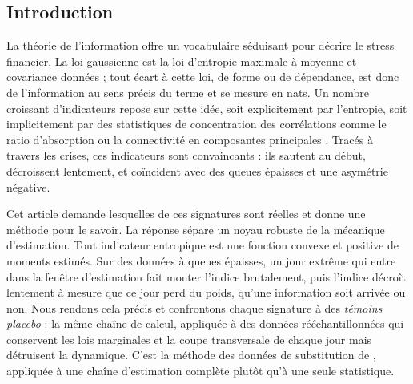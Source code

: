 \documentclass[12pt]{article}
\theoremstyle{definition}
\begin{document}
\begin{doublespace}

\section{Introduction}
\label{sec:intro}

La théorie de l'information offre un vocabulaire séduisant pour décrire le
stress financier. La loi gaussienne est la loi d'entropie maximale à moyenne
et covariance données ; tout écart à cette loi, de forme ou de dépendance, est
donc de l'information au sens précis du terme et se mesure en nats. Un nombre
croissant d'indicateurs repose sur cette idée, soit explicitement par
l'entropie, soit implicitement par des statistiques de concentration des
corrélations comme le ratio d'absorption \citep{kritzman2011} ou la
connectivité en composantes principales \citep{billio2012}. Tracés à travers
les crises, ces indicateurs sont convaincants : ils sautent au début, décroissent
lentement, et coïncident avec des queues épaisses et une asymétrie négative.

Cet article demande lesquelles de ces signatures sont réelles et donne une
méthode pour le savoir. La réponse sépare un noyau robuste de la mécanique
d'estimation. Tout indicateur entropique est une fonction
convexe et positive de moments estimés. Sur des données à queues épaisses, un
jour extrême qui entre dans la fenêtre d'estimation fait monter l'indice
brutalement, puis l'indice décroît lentement à mesure que ce jour perd du
poids, qu'une information soit arrivée ou non. Nous rendons cela précis et
confrontons chaque signature à des \emph{témoins placebo} : la même chaîne de
calcul, appliquée à des données rééchantillonnées qui conservent les lois
marginales et la coupe transversale de chaque jour mais détruisent la
dynamique. C'est la méthode des données de substitution de
\citet{theiler1992}, appliquée à une chaîne d'estimation complète plutôt qu'à
une seule statistique.


\end{doublespace}
\end{document}
